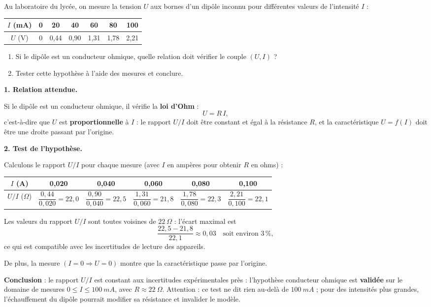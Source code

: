 \documentclass[11pt]{article}
\begin{document}
\begin{exoresolu}
Au laboratoire du lycée, on mesure la tension $U$ aux bornes d'un dipôle inconnu pour différentes valeurs de l'intensité $I$ :

\begin{center}
\begin{tabular}{|c|cccccc|}
\hline
$I$ (mA) & 0 & 20 & 40 & 60 & 80 & 100 \\
\hline
$U$ (V) & 0 & 0,44 & 0,90 & 1,31 & 1,78 & 2,21 \\
\hline
\end{tabular}
\end{center}

\begin{enumerate}
\item Si le dipôle est un conducteur ohmique, quelle relation doit vérifier le couple $(U, I)$ ?
\item Tester cette hypothèse à l'aide des mesures et conclure.
\end{enumerate}
\tcblower
\textbf{1. Relation attendue.}

Si le dipôle est un conducteur ohmique, il vérifie la \textbf{loi d'Ohm} :
\[ U = R\,I, \]
c'est-à-dire que $U$ est \textbf{proportionnelle} à $I$ : le rapport $U/I$ doit être constant et égal à la résistance $R$, et la caractéristique $U = f(I)$ doit être une droite passant par l'origine.

\textbf{2. Test de l'hypothèse.}

Calculons le rapport $U/I$ pour chaque mesure (avec $I$ en ampères pour obtenir $R$ en ohms) :

\begin{center}
\begin{tabular}{|c|ccccc|}
\hline
$I$ (A) & 0,020 & 0,040 & 0,060 & 0,080 & 0,100 \\
\hline
$U/I$ ($\Omega$) & $\dfrac{0,44}{0,020}=22,0$ & $\dfrac{0,90}{0,040}=22,5$ & $\dfrac{1,31}{0,060}=21,8$ & $\dfrac{1,78}{0,080}=22,3$ & $\dfrac{2,21}{0,100}=22,1$ \\
\hline
\end{tabular}
\end{center}

Les valeurs du rapport $U/I$ sont toutes voisines de $\SI{22}{\Omega}$ : l'écart maximal est
\[ \dfrac{22,5 - 21,8}{22,1} \approx 0,03 \quad \text{soit environ } 3\,\%, \]
ce qui est compatible avec les incertitudes de lecture des appareils.

De plus, la mesure $(I=0 \Rightarrow U=0)$ montre que la caractéristique passe par l'origine.

\textbf{Conclusion} : le rapport $U/I$ est constant aux incertitudes expérimentales près : l'hypothèse \og conducteur ohmique \fg{} est \textbf{validée} sur le domaine de mesures $0 \leq I \leq \SI{100}{mA}$, avec $R \approx \SI{22}{\Omega}$. Attention : ce test ne dit rien au-delà de $\SI{100}{mA}$ ; pour des intensités plus grandes, l'échauffement du dipôle pourrait modifier sa résistance et invalider le modèle.
\end{exoresolu}
\end{document}
